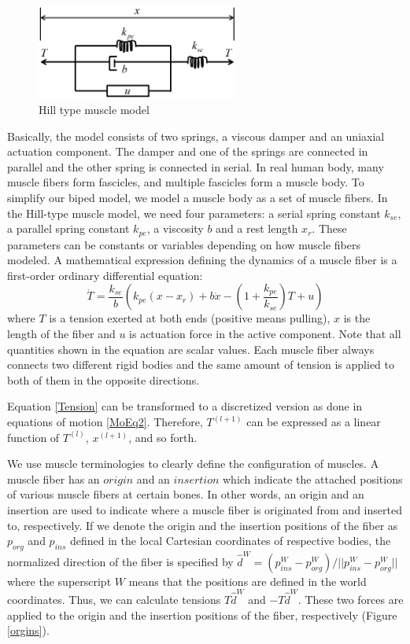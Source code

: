 \documentclass[master,english,final]{kaist-ucs}
\begin{document}
\begin{figure}[h!]
  \centering
  \includegraphics[width=2.6in]{musclemodel}
  \caption{Hill type muscle model}
  \label{hilltype}
\end{figure}
\noindent Basically, the model consists of two springs, a viscous damper and an uniaxial actuation component.
The damper and one of the springs are connected in parallel and the other spring is
connected in serial.
In real human body, many muscle fibers form fascicles, and multiple fascicles form a muscle body.
To simplify our biped model, we model a muscle body as a set of muscle fibers.
In the Hill-type muscle model, we need four parameters:
a serial spring constant $k_{se}$, a parallel spring constant $k_{pe}$, a viscosity $b$ and a rest length $x_{r}$.
These parameters can be constants or variables depending on how muscle fibers modeled.
A mathematical expression defining the dynamics of a muscle fiber is a first-order ordinary differential equation:
\begin{equation}\label{Tension}
\dot{T} = \frac{k_{se}}{b} \left( k_{pe}(x-x_{r})+b\dot{x}-\left(1+\frac{k_{pe}}{k_{se}}\right)T+u   \right)
\end{equation}
where $T$ is a tension exerted at both ends (positive means pulling),
$x$ is the length of the fiber and $u$ is actuation force in the active component.
Note that all quantities shown in the equation are scalar values.
Each muscle fiber always connects two different rigid bodies and the same amount of
tension is applied to both of them in the opposite directions.

Equation \eqref{Tension} can be transformed to a discretized version as done in equations of motion \eqref{MoEq2}.
Therefore, $T^{(l+1)}$ can be expressed as a linear function of $T^{(l)}$, $x^{(l+1)}$, and so forth.

We use muscle terminologies to clearly define the configuration of muscles.
A muscle fiber has an $origin$ and an $insertion$ which indicate the attached positions
of various muscle fibers at certain bones.
In other words, an origin and an insertion are used to indicate where a muscle fiber is originated from and inserted to, respectively.
If we denote the origin and the insertion positions of the fiber as $p_{org}$ and $p_{ins}$ defined in
the local Cartesian coordinates of respective bodies,
the normalized direction of the fiber is specified by
$\hat{d}^{W}=(p^{W}_{ins}-p^{W}_{org})/||p^{W}_{ins}-p^{W}_{org}||$ where
the superscript $W$ means that the positions are defined in the world coordinates.
Thus, we can calculate tensions $T\hat{d}^{W}$ and $-T\hat{d}^{W}$.
These two forces are applied to the origin and the insertion positions of the fiber, respectively (Figure \ref{orgins}).
\end{document}
